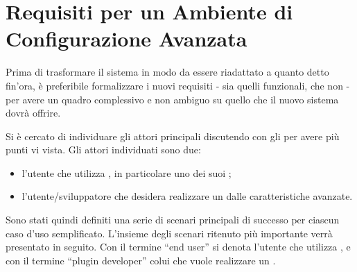 \section{Requisiti per un Ambiente di Configurazione Avanzata}
Prima di trasformare il sistema in modo da essere riadattato a quanto detto fin'ora, è preferibile formalizzare i nuovi requisiti - sia quelli funzionali, che non - per avere un quadro complessivo e non ambiguo su quello che il nuovo sistema dovrà offrire. 

Si è cercato di individuare gli attori principali discutendo con gli \stakeholders{} per avere più punti vi vista. Gli attori individuati sono due:
\begin{itemize}
\item l'utente che utilizza \visualnetkit{}, in particolare uno dei suoi \plugin{};
\item l'utente/sviluppatore che desidera realizzare un \plugin{} dalle caratteristiche avanzate.
\end{itemize}
Sono stati quindi definiti una serie di scenari principali di successo per ciascun caso d'uso semplificato. L'insieme degli scenari ritenuto più importante verrà presentato in seguito. Con il termine ``end user'' si denota l'utente che utilizza \visualnetkit{}, e con il termine ``plugin developer'' colui che vuole realizzare un \plugin{}.

